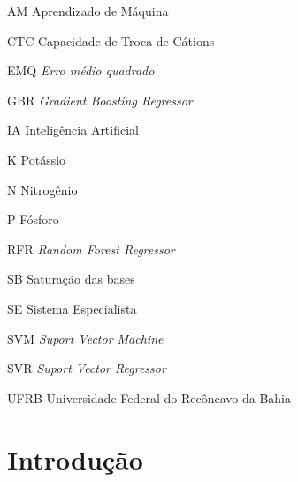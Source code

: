\documentclass[
12pt,				%
oneside,			%
a4paper,			%
english,			%
french,				%
spanish,			%
brazil				%
]{abntex2}
\begin{document}
\listoffigures*
\cleardoublepage



\begin{siglas}

\item[AM] Aprendizado de Máquina
\item[CTC] Capacidade de Troca de Cátions
\item[EMQ] \textit{Erro médio quadrado}
\item[GBR] \textit{Gradient Boosting Regressor}
\item[IA] Inteligência Artificial
\item[K] Potássio
\item[N] Nitrogênio
\item[P] Fósforo
\item[RFR] \textit{Random Forest Regressor}
\item[SB] Saturação das bases
\item[SE] Sistema Especialista
\item[SVM] \textit{Suport Vector Machine}
\item[SVR] \textit{Suport Vector Regressor}
\item[UFRB] Universidade Federal do Recôncavo da Bahia


\end{siglas}





\tableofcontents*
\cleardoublepage



\textual

\chapter[Introdução]{Introdução}


\end{document}
